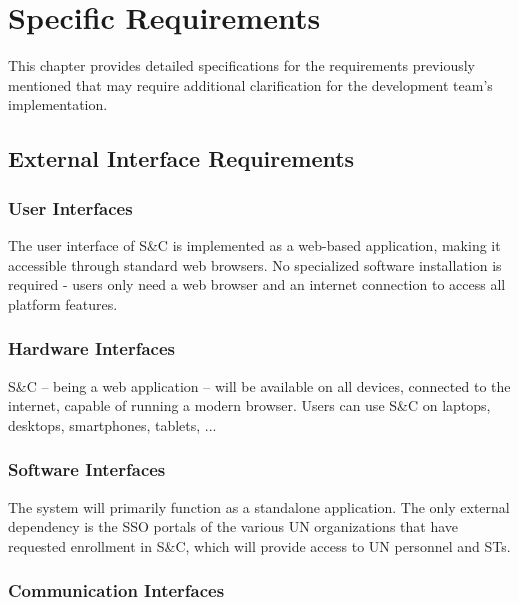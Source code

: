 \chapter{Specific Requirements}
\label{chap:specific-requirements}%

\par This chapter provides detailed specifications for the requirements previously mentioned that may require
additional clarification for the development team's implementation.

\section{External Interface Requirements}
\label{sec:external-interface-requirements}%

\subsection{User Interfaces}
\label{subsec:user-interfaces}%

\par The user interface of S\&C is implemented as a web-based application, making it accessible through standard web
browsers. No specialized software installation is required - users only need a web browser and an internet connection
to access all platform features.

\subsection{Hardware Interfaces}
\label{subsec:hardware-interfaces}%

\par S\&C – being a web application – will be available on all devices, connected to the internet, capable of running a
modern browser. Users can use S\&C on laptops, desktops, smartphones, tablets, ...

\subsection{Software Interfaces}
\label{subsec:software-interfaces}%

\par The system will primarily function as a standalone application. The only external dependency is the SSO portals of
the various UN organizations that have requested enrollment in S\&C, which will provide access to UN personnel and STs.

\subsection{Communication Interfaces}
\label{subsec:communication-interfaces}%

